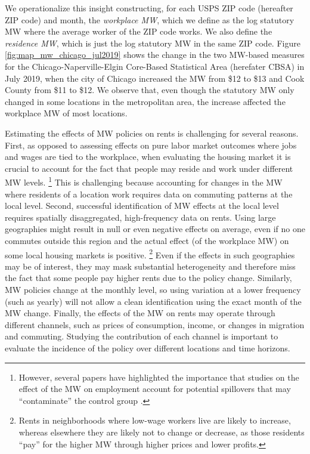We operationalize this insight constructing, for each USPS ZIP code (hereafter 
ZIP code) and month,
the \textit{workplace MW}, which we define as the log statutory MW where
the average worker of the ZIP code works.
We also define the \textit{residence MW}, which is just the log statutory MW in 
the same ZIP code.
Figure \ref{fig:map_mw_chicago_jul2019} shows the change in the two MW-based 
measures for the Chicago-Naperville-Elgin Core-Based Statistical Area 
(herefater CBSA) in July 2019, 
when the city of Chicago increased the MW from \$12 to \$13 and 
Cook County from \$11 to \$12.
We observe that, even though the statutory MW only changed in some locations in
the metropolitan area, the increase affected the workplace MW of most locations.


Estimating the effects of MW policies on rents is challenging for several 
reasons.
First, as opposed to assessing effects on pure labor market outcomes where jobs 
and wages are tied to the workplace, when evaluating the housing market it is 
crucial to account for the fact that people may reside and work under different 
MW levels.%
\footnote{However, several papers have highlighted the importance that studies
on the effect of the MW on employment account for potential spillovers that may
``contaminate'' the control group 
\parencite{Kuehn2016, JardimEtAl2022discontinuity}.}
This is challenging because accounting for changes in the MW where residents
of a location work requires data on commuting patterns at the local level.
Second, successful identification of MW effects at the local level requires 
spatially disaggregated, high-frequency data on rents.
Using large geographies might result in null or even negative effects on average,
even if no one commutes outside this region and the actual effect (of the
workplace MW) on some local housing markets is positive.%
\footnote{Rents in neighborhoods where low-wage workers live are likely to 
increase, whereas elsewhere they are likely not to change or decrease, 
as those residents ``pay'' for the higher MW through higher prices and lower 
profits.}
Even if the effects in such geographies may be of interest, they may mask 
substantial heterogeneity and therefore miss the fact that some people pay 
higher rents due to the policy change.
Similarly, MW policies change at the monthly level, so using variation at a lower
frequency (such as yearly) will not allow a clean identification using the exact 
month of the MW change.
Finally, the effects of the MW on rents may operate through different channels,
such as prices of consumption, income, or changes in migration and commuting.
Studying the contribution of each channel is important to evaluate the incidence 
of the policy over different locations and time horizons.

